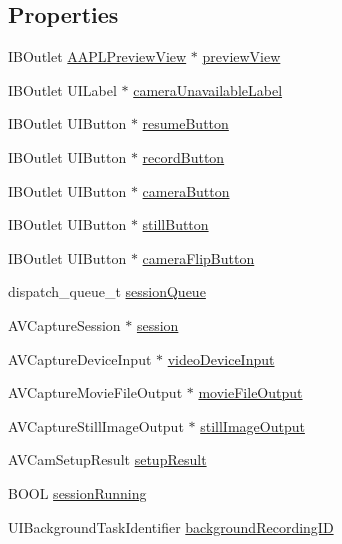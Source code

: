 \subsection*{Properties}
\begin{DoxyCompactItemize}
\item 
I\+B\+Outlet \hyperlink{interface_a_a_p_l_preview_view}{A\+A\+P\+L\+Preview\+View} $\ast$ \hyperlink{category_a_a_p_l_camera_view_controller_07_08_a6c0ff6298428d5d6ba8428719ab8da8c}{preview\+View}
\item 
I\+B\+Outlet U\+I\+Label $\ast$ \hyperlink{category_a_a_p_l_camera_view_controller_07_08_a491ad191c463a1b34db8f8e9f8be007b}{camera\+Unavailable\+Label}
\item 
I\+B\+Outlet U\+I\+Button $\ast$ \hyperlink{category_a_a_p_l_camera_view_controller_07_08_a13cd4947116cf44ec65f5a909e974bf2}{resume\+Button}
\item 
I\+B\+Outlet U\+I\+Button $\ast$ \hyperlink{category_a_a_p_l_camera_view_controller_07_08_a4beedbce5b68b1258bc03fff0c1c85af}{record\+Button}
\item 
I\+B\+Outlet U\+I\+Button $\ast$ \hyperlink{category_a_a_p_l_camera_view_controller_07_08_a89a5965bea2a1417d7cd8b656fe8e664}{camera\+Button}
\item 
I\+B\+Outlet U\+I\+Button $\ast$ \hyperlink{category_a_a_p_l_camera_view_controller_07_08_a74d10026a7a46d06e678af46eea8c582}{still\+Button}
\item 
I\+B\+Outlet U\+I\+Button $\ast$ \hyperlink{category_a_a_p_l_camera_view_controller_07_08_af9744f0b8b0071e9fa94adeaeb4cca6e}{camera\+Flip\+Button}
\item 
dispatch\+\_\+queue\+\_\+t \hyperlink{category_a_a_p_l_camera_view_controller_07_08_a1c6005805620e1a4b0a11d08961d7421}{session\+Queue}
\item 
A\+V\+Capture\+Session $\ast$ \hyperlink{category_a_a_p_l_camera_view_controller_07_08_a9e0e89f0e1e23a974dfbaa5f902bc544}{session}
\item 
A\+V\+Capture\+Device\+Input $\ast$ \hyperlink{category_a_a_p_l_camera_view_controller_07_08_a2103e56d25d443b453c3ddca2255e6ed}{video\+Device\+Input}
\item 
A\+V\+Capture\+Movie\+File\+Output $\ast$ \hyperlink{category_a_a_p_l_camera_view_controller_07_08_a74f798d0d6a3b6ad4353cec74a0413ef}{movie\+File\+Output}
\item 
A\+V\+Capture\+Still\+Image\+Output $\ast$ \hyperlink{category_a_a_p_l_camera_view_controller_07_08_a1befc1fbbfd7ff51c67dc90dd70721cc}{still\+Image\+Output}
\item 
A\+V\+Cam\+Setup\+Result \hyperlink{category_a_a_p_l_camera_view_controller_07_08_a9ad00f337269ebe168e9c7436ca36e65}{setup\+Result}
\item 
B\+O\+OL \hyperlink{category_a_a_p_l_camera_view_controller_07_08_a05e15dd11610b59012058a35113984e9}{session\+Running}
\item 
U\+I\+Background\+Task\+Identifier \hyperlink{category_a_a_p_l_camera_view_controller_07_08_a2a07e86de4a0866b894a59f250be35b3}{background\+Recording\+ID}
\end{DoxyCompactItemize}



